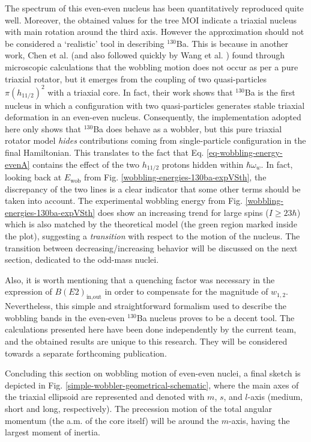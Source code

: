 The spectrum of this even-even nucleus has been quantitatively reproduced quite well. Moreover, the obtained values for the tree MOI indicate a triaxial nucleus with main rotation around the third axis. However the approximation should not be considered a `realistic' tool in describing $^{130}$Ba. This is because in another work, Chen et al. \cite{chen2019transverse} (and also followed quickly by Wang et al. \cite{wang2020two}) found through microscopic calculations that the wobbling motion does not occur as per a pure triaxial rotator, but it emerges from the coupling of two quasi-particles $\pi(h_{11/2})^2$ with a triaxial core. In fact, their work shows that $^{130}$Ba is the first nucleus in which a configuration with two quasi-particles generates stable triaxial deformation in an even-even nucleus. Consequently, the implementation adopted here only shows that $^{130}$Ba does behave as a wobbler, but this pure triaxial rotator model \emph{hides} contributions coming from single-particle configuration in the final Hamiltonian. This translates to the fact that Eq. \ref{eq-wobbling-energy-evenA} contains the effect of the two $h_{11/2}$ protons hidden within $\hbar\omega_w$. In fact, looking back at $E_\text{wob}$ from Fig. \ref{wobbling-energies-130ba-expVSth}, the discrepancy of the two lines is a clear indicator that some other terms should be taken into account. The experimental wobbling energy from Fig. \ref{wobbling-energies-130ba-expVSth} does show an increasing trend for large spins ($I\geq 23\hbar$) which is also matched by the theoretical model (the green region marked inside the plot), suggesting a \emph{transition} with respect to the motion of the nucleus. The transition between decreasing/increasing behavior will be discussed on the next section, dedicated to the odd-mass nuclei.

Also, it is worth mentioning that a quenching factor was necessary in the expression of $B(E2)_\text{in,out}$ in order to compensate for the magnitude of $w_{1,2}$. Nevertheless, this simple and straightforward formalism used to describe the wobbling bands in the even-even $^{130}$Ba nucleus proves to be a decent tool. The calculations presented here have been done independently by the current team, and the obtained results are unique to this research. They will be considered towards a separate forthcoming publication.

Concluding this section on wobbling motion of even-even nuclei, a final sketch is depicted in Fig. \ref{simple-wobbler-geometrical-schematic}, where the main axes of the triaxial ellipsoid are represented and denoted with $m$, $s$, and $l$-axis (medium, short and long, respectively). The precession motion of the total angular momentum (the a.m. of the core itself) will be around the $m$-axis, having the largest moment of inertia.

